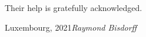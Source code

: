 \vspace{0.3cm}
Their help is gratefully acknowledged.

\vspace{\baselineskip}
\begin{flushright}\noindent
Luxembourg, 2021\hfill {\it Raymond Bisdorff}\\
\end{flushright}



